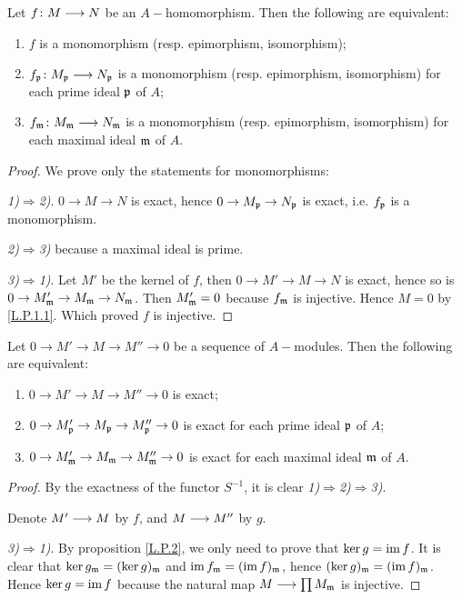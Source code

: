   \begin{prop}\label{L.P.2}
    Let $f\colon M\longrightarrow N$ be an $A-$homomorphism. Then the following are equivalent:
    \begin{enumerate}
      \item $f$ is a monomorphism (resp. epimorphism, isomorphism);
      \item $f_{\mathfrak{p}}\colon M_{\mathfrak{p}}\longrightarrow N_{\mathfrak{p}}$ is a monomorphism (resp. epimorphism, isomorphism) for each prime ideal $\mathfrak{p}$ of $A$;
      \item $f_{\mathfrak{m}}\colon M_{\mathfrak{m}}\longrightarrow N_{\mathfrak{m}}$ is a monomorphism (resp. epimorphism, isomorphism) for each maximal ideal $\mathfrak{m}$ of $A$.
    \end{enumerate}
  \end{prop}
  \begin{proof}
    We prove only the statements for monomorphisms:

    \emph{1)$\Rightarrow$2)}. $0\to M\to N$ is exact, hence $0\to M_{\mathfrak{p}}\to N_{\mathfrak{p}}$ is exact, i.e. $f_{\mathfrak{p}}$ is a monomorphism.

    \emph{2)$\Rightarrow$3)} because a maximal ideal is prime.

    \emph{3)$\Rightarrow$1)}. Let $M'$ be the kernel of $f$, then $0\to M'\to M\to N$ is exact, hence so is $0\to M'_{\mathfrak{m}}\to M_{\mathfrak{m}}\to N_{\mathfrak{m}}$. Then $M'_{\mathfrak{m}}=0$ because $f_{\mathfrak{m}}$ is injective. Hence $M=0$ by \ref{L.P.1.1}. Which proved $f$ is injective.
  \end{proof}

  \begin{prop}\label{L.P.3}
    Let $0\to M'\to M\to M''\to 0$ be a sequence of $A-$modules. Then the following are equivalent:
    \begin{enumerate}
      \item $0\to M'\to M\to M''\to 0$ is exact;
      \item $0\to M'_{\mathfrak{p}}\to M_{\mathfrak{p}}\to M''_{\mathfrak{p}}\to 0$ is exact for each prime ideal $\mathfrak{p}$ of $A$;
      \item $0\to M'_{\mathfrak{m}}\to M_{\mathfrak{m}}\to M''_{\mathfrak{m}}\to 0$ is exact for each maximal ideal $\mathfrak{m}$ of $A$.
    \end{enumerate}
  \end{prop}
  \begin{proof}
    By the exactness of the functor $S^{-1}$, it is clear \emph{1)$\Rightarrow$2)$\Rightarrow$3)}.

    Denote $M'\longrightarrow M$ by $f$, and $M\longrightarrow M''$ by $g$.

    \emph{3)$\Rightarrow$1)}. By proposition \ref{L.P.2}, we only need to prove that $\ker g=\operatorname{im} f$.
    It is clear that $\ker g_{\mathfrak{m}}=(\ker g)_{\mathfrak{m}}$ and $\operatorname{im} f_{\mathfrak{m}}=(\operatorname{im} f)_{\mathfrak{m}}$, hence $(\ker g)_{\mathfrak{m}}=(\operatorname{im} f)_{\mathfrak{m}}$. Hence $\ker g=\operatorname{im} f$ because the natural map $M\longrightarrow\prod M_{\mathfrak{m}}$ is injective.
  \end{proof}

